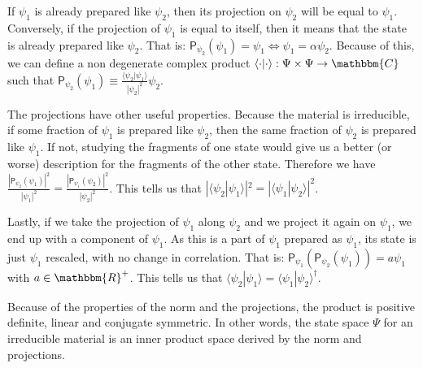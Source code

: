 \documentclass[aps,pra,10pt,twocolumn,floatfix,nofootinbib]{revtex4-1}
\numberwithin{equation}{section}
\theoremstyle{definition}
\begin{document}
If $\psi_1$ is already prepared like $\psi_2$, then its projection on $\psi_2$ will be equal to $\psi_1$. Conversely, if the projection of $\psi_1$ is equal to itself, then it means that the state is already prepared like $\psi_2$. That is: $\mathsf{P}_{\psi_2} (\psi_1) = \psi_1 \Leftrightarrow \psi_1 = \alpha \psi_2$. Because of this, we can define a non degenerate complex product $\langle \cdot |\cdot \rangle : \Psi \times \Psi \rightarrow \mathbbm{C}$ such that $\mathsf{P}_{\psi_2} (\psi_1) \equiv \frac{\langle \psi_2|\psi_1 \rangle}{|\psi_2|^2} \psi_2$.

The projections have other useful properties. Because the material is irreducible, if some fraction of $\psi_1$ is prepared like $\psi_2$, then the same fraction of $\psi_2$ is prepared like $\psi_1$. If not, studying the fragments of one state would give us a better (or worse) description for the fragments of the other state. Therefore we have $\frac{|\mathsf{P}_{\psi_2} (\psi_1)|^2}{|\psi_1|^2}=\frac{|\mathsf{P}_{\psi_1} (\psi_2)|^2}{|\psi_2|^2}$. This tells us that $|\langle \psi_2|\psi_1 \rangle|^2 = |\langle \psi_1|\psi_2 \rangle|^2$.

Lastly, if we take the projection of $\psi_1$ along $\psi_2$ and we project it again on $\psi_1$, we end up with a component of $\psi_1$. As this is a part of $\psi_1$ prepared as $\psi_1$, its state is just $\psi_1$ rescaled, with no change in correlation. That is: $\mathsf{P}_{\psi_1} (\mathsf{P}_{\psi_2} (\psi_1)) = a \psi_1$ with $a \in \mathbbm{R}^+$. This tells us that $\langle \psi_2|\psi_1 \rangle = \langle \psi_1|\psi_2 \rangle^\dagger$.

Because of the properties of the norm and the projections, the product is positive definite, linear and conjugate symmetric. In other words, the state space $\Psi$ for an irreducible material is an inner product space derived by the norm and projections.
 
\end{document}

